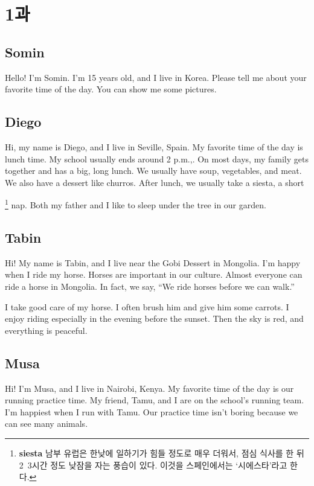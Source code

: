 \documentclass[9pt, a4paper]{oblivoir}
\renewcommand{\thefootnote}{\alph{footnote}}
\newcommand{\symfootnote}[1]{%
\let\oldthefootnote=\thefootnote%
\stepcounter{mpfootnote}%
\addtocounter{footnote}{-1}%
\renewcommand{\thefootnote}{\fnsymbol{mpfootnote}}%
\footnote{#1}%
\let\thefootnote=\oldthefootnote%
}
\begin{document}
    \section*{1과}
     
        \subsection*{Somin}
        \noindent
        Hello! I'm Somin. I'm 15 years old, and I live in Korea. Please tell me  about your favorite time of the day. You can show me some pictures.

        \subsection*{Diego}
        \noindent
        
        Hi, my name is Diego, and I live in Seville, Spain. My favorite time of the day is lunch time. My school usually ends around 2 p.m.,.
        On most days, my family gets together and has a big, long lunch. We usually have soup, vegetables, and meat. We also have a dessert like churros. After lunch, we usually take a siesta, a short\symfootnote{\textbf{siesta} 남부 유럽은 한낮에 일하기가 힘들 정도로 매우 더워서, 점심 식사를 한 뒤 2~3시간 정도 낮잠을 자는 풍습이 있다. 이것을 스페인에서는 `시에스타'라고 한다.} nap. 
        Both my father and I like to sleep under the tree in our garden. 

        \subsection*{Tabin}
        \noindent

        Hi! My name is Tabin, and I live near the Gobi Dessert in Mongolia. I'm happy when I ride my horse. Horses are important in our culture. Almost everyone can ride a horse in Mongolia. In fact, we say, ``We ride horses before we can walk.''

        I take good care of my horse. I often brush him and give him some carrots. I enjoy riding especially in the evening before the sunset. Then the sky is red, and everything is peaceful.

        \subsection*{Musa}
        \noindent
        
        Hi! I'm Musa, and I live in Nairobi, Kenya. My favorite time of the day is our running practice time. My friend, Tamu, and I are on the school's running team. I'm happiest when I run with Tamu. Our practice time isn't boring because we can see many animals. 
\end{document}
